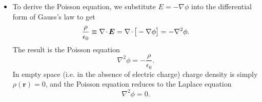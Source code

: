 \documentclass[11pt, a4paper]{article}
\renewcommand{\vec}[1]{\bm{#1}} %
\renewcommand{\r}{\vec{r}}
\newcommand{\E}{\vec{E}} %
\newcommand{\ee}{\epsilon_{0}}  %
\renewcommand{\div}{\nabla \mspace{-2mu} \cdot \mspace{-2mu}}
\renewcommand{\grad}{\nabla}
\renewcommand{\laplacian}{\nabla^{2}}
\begin{document}
\begin{itemize}
    \item To derive the Poisson equation, we substitute $ E = - \grad \phi $ into the differential form of Gauss's law to get
	\begin{equation*}
		\frac{\rho}{\ee} \equiv \div \E = \div \big[- \grad \phi \big]= - \laplacian \phi.
	\end{equation*}
	The result is the Poisson equation
	\begin{equation*}
		\laplacian \phi = - \frac{\rho}{\ee}.
	\end{equation*}
	In empty space (i.e. in the absence of electric charge) charge density is simply $ \rho(\r) = 0 $, and the Poisson equation reduces to the Laplace equation
	\begin{equation*}
		\laplacian \phi = 0.
	\end{equation*}
    
\end{itemize}
    
\end{document}
